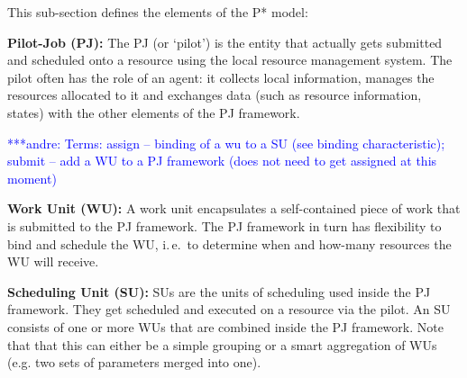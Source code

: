 \documentclass[conference,final]{IEEEtran}
\newcommand{\jhanote}[1]{ {\textcolor{red} { ***shantenu: #1 }}}
\newcommand{\alnote}[1]{ {\textcolor{blue} { ***andre: #1 }}}
\newcommand{\alnote}[1]{}
\newcommand{\jhanote}[1]{}
\begin{document}
\noindent
This sub-section defines the elements of the P* model:

\begin{compactitem}
\item \textbf{Pilot-Job (PJ):} The PJ (or `pilot') is
  the entity that actually gets submitted and scheduled onto a
  resource using the local resource management system. The pilot often
  has the role of an agent: it collects local information, manages the
  resources allocated to it and exchanges data (such as resource
  information, states) with the other elements of the PJ
  framework. %

\alnote{Terms: assign -- binding of a wu to a SU (see binding
characteristic); submit -- add a WU to a PJ framework (does not need to get
assigned at this moment)}
\item \textbf{Work Unit (WU):} A work unit %
  encapsulates a self-contained piece of work that is submitted to the
  PJ framework. 
 The PJ framework in turn has flexibility to bind and schedule the
  WU, i.\,e.\ to determine when and how-many resources the WU will
  receive.  %

\item \textbf{Scheduling Unit (SU):} SUs are the units of scheduling
  used inside the PJ framework. They get scheduled and executed on a
  resource via the pilot. An SU consists of one or more WUs that are
  combined inside the PJ framework. Note that that this can either be
  a simple grouping or a smart aggregation of WUs (e.g. two sets of
  parameters merged into one).


\end{compactitem}
\end{document}
